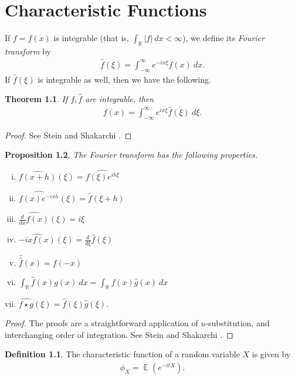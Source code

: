 \documentclass[12pt]{amsbook}
\newcommand{\rr}{\mathbb{R}}
\newcommand{\wh}{\widehat}
\DeclareMathOperator{\ex}{\mathbb{E}}
\theoremstyle{plain}
\newtheorem{theorem}{Theorem}
\newtheorem{proposition}[theorem]{Proposition}
\theoremstyle{definition}
\newtheorem*{definition}{Definition}
\theoremstyle{remark}
\numberwithin{equation}{section}  %
\begin{document}
	\chapter{Characteristic Functions}
	If $f = f(x)$ is integrable (that is, $\int_{\rr}| f | \ dx < \infty$), we define its \emph{Fourier transform} by
	\begin{equation*}
		\begin{split}
			\hat{f}(\xi) = \int_{-\infty}^{\infty} e^{-i x \xi} f(x) \ dx.
		\end{split}
	\end{equation*}
	If $ \hat{f}(\xi)$ is integrable as well, then we have the
	following.
	\begin{theorem}\label{thm:fourier-inversion}
		If $f, \hat{f}$ are integrable, then
		\begin{equation*}
			\begin{split}
				f(x) = \int_{-\infty}^{\infty} e^{i x \xi} \hat{f}(\xi) \ d \xi.
			\end{split}
		\end{equation*}
	\end{theorem}
	\begin{proof}
		See Stein and Shakarchi \cite{zbMATH02171466}.
	\end{proof}
	\begin{proposition}\label{prop:fourier-props}
		The Fourier transform has the following properties.
		\begin{enumerate}[(i)]
			\item	$\wh{f(x+h)}(\xi) = \wh{f(\xi) e^{i h \xi}}$
			\item $\wh{f(x) e^{-i x h}}(\xi) = \wh{f}(\xi + h)$	
			\item $\wh{\frac{d}{dx} f(x)}(\xi) = i \xi$
			\item $\wh{-ix f(x)}(\xi) = \frac{d}{d \xi}\wh{f}(\xi)$
			\item $\hat{\hat{f}}(x) = f(-x)$
			\item $\int_{\rr} \wh{f}(x) g(x) \ dx = \int_{\rr} f(x) \wh{g}(x) \ dx$
			\item $\wh{f \star g}(\xi) = \wh{f}(\xi) \wh{g}(\xi)$.
		\end{enumerate}
	\end{proposition}
	\begin{proof}
		The proofs are a straightforward
		application of $u$-substitution, and interchanging order of integration.
		See Stein and Shakarchi \cite{zbMATH02171466}. 
	\end{proof}
	\begin{definition}
		The characteristic function of a random variable $X$ is given by
		\begin{equation*}
			\begin{split}
				\phi_{X} = \ex(e^{-itX}).
			\end{split}
		\end{equation*}
	\end{definition}
\end{document}
